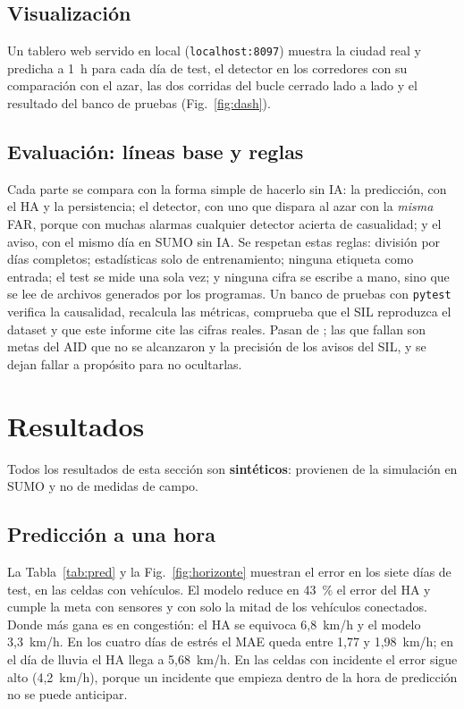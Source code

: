 \documentclass[conference,a4paper]{IEEEtran}
\begin{document}
\subsection{Visualización}
Un tablero web servido en local (\texttt{localhost:8097}) muestra la ciudad real y predicha a 1~h para cada día de test, el detector en los corredores con su comparación con el azar, las dos corridas del bucle cerrado lado a lado y el resultado del banco de pruebas (Fig.~\ref{fig:dash}).

\subsection{Evaluación: líneas base y reglas}
Cada parte se compara con la forma simple de hacerlo sin IA: la predicción, con el HA y la persistencia; el detector, con uno que dispara al azar con la \emph{misma} FAR, porque con muchas alarmas cualquier detector acierta de casualidad; y el aviso, con el mismo día en SUMO sin IA. Se respetan estas reglas: división por días completos; estadísticas solo de entrenamiento; ninguna etiqueta como entrada; el test se mide una sola vez; y ninguna cifra se escribe a mano, sino que se lee de archivos generados por los programas. Un banco de \PruebasTotal{} pruebas con \texttt{pytest} verifica la causalidad, recalcula las métricas, comprueba que el SIL reproduzca el dataset y que este informe cite las cifras reales. Pasan \PruebasOk{} de \PruebasTotal{}; las \PruebasFallan{} que fallan son metas del AID que no se alcanzaron y la precisión de los avisos del SIL, y se dejan fallar a propósito para no ocultarlas.

\section{Resultados}
Todos los resultados de esta sección son \textbf{sintéticos}: provienen de la simulación en SUMO y no de medidas de campo.

\subsection{Predicción a una hora}
La Tabla~\ref{tab:pred} y la Fig.~\ref{fig:horizonte} muestran el error en los siete días de test, en las celdas con vehículos. El modelo reduce en 43~\% el error del HA y cumple la meta con sensores y con solo la mitad de los vehículos conectados. Donde más gana es en congestión: el HA se equivoca 6,8~km/h y el modelo 3,3~km/h. En los cuatro días de estrés el MAE queda entre 1,77 y 1,98~km/h; en el día de lluvia el HA llega a 5,68~km/h. En las celdas con incidente el error sigue alto (4,2~km/h), porque un incidente que empieza dentro de la hora de predicción no se puede anticipar.
\end{document}
